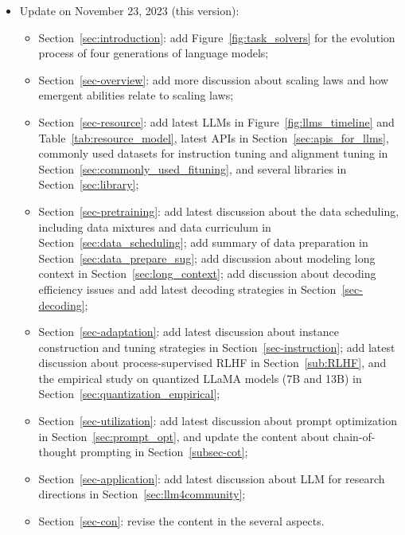 {\begin{itemize}
\begin{itemize}
\item {Section~\ref{sec-utilization}: update the content about the planning for complex task solving in Section~\ref{subsec-planning};}
\item {Section~\ref{sec-evaluation}: add  discussions about evaluation approaches in Section~\ref{subsec-evaapp}, Table~\ref{tab-category-evaluation} for the category of existing evaluation work, and update empirical ability evaluation in Section~\ref{sec-empirical} and the results on Table~\ref{tab-experimental-res};}
\item  {Section~\ref{subsec:promptdesign}: add new prompt examples in Table~\ref{tab-tips};}%
\end{itemize}

\item {Update on November 23, 2023 (this version): }
\begin{itemize}
    \item %
    {
Section~\ref{sec:introduction}: add Figure~\ref{fig:task_solvers} for the evolution process of four generations of language models;}
    \item %
    {Section~\ref{sec-overview}: add more discussion about scaling laws and how emergent abilities relate to scaling laws;}
    \item {Section~\ref{sec-resource}: add latest LLMs in Figure~\ref{fig:llms_timeline} and Table~\ref{tab:resource_model}, latest APIs in Section~\ref{sec:apis_for_llms}, commonly used datasets for instruction tuning and alignment tuning in Section~\ref{sec:commonly_used_fituning}, and several libraries in Section~\ref{sec:library};}
    \item {Section~\ref{sec-pretraining}: add latest discussion about the data scheduling, including data mixtures and data curriculum in Section~\ref{sec:data_scheduling}; add summary of data preparation in Section~\ref{sec:data_prepare_sug}; add discussion about modeling long context in Section~\ref{sec:long_context}; add discussion about decoding efficiency issues and add latest decoding strategies in Section~\ref{sec-decoding};}
    \item {Section~\ref{sec-adaptation}: add latest discussion about instance construction and tuning strategies in Section~\ref{sec-instruction}; add latest discussion about process-supervised RLHF in Section~\ref{sub:RLHF}, and the empirical study on quantized LLaMA models (7B and 13B) in Section~\ref{sec:quantization_empirical};}
    \item {Section~\ref{sec-utilization}: add latest discussion about prompt optimization in Section~\ref{sec:prompt_opt}, and update the content about chain-of-thought prompting in Section~\ref{subsec-cot};}
    \item {Section~\ref{sec-application}: add latest discussion about LLM for research directions in Section~\ref{sec:llm4community};}
    \item {Section~\ref{sec-con}: revise the content in the several aspects.}
\end{itemize}


\end{itemize}}
